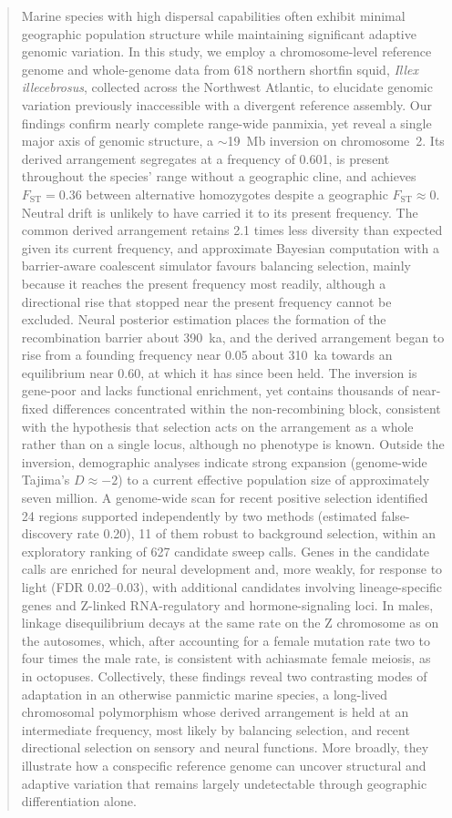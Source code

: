 \documentclass[11pt]{article}
\newcommand{\illex}{\textit{Illex illecebrosus}}
\newcommand{\Fst}{F_\mathrm{ST}}
\begin{document}
\begin{abstract}
\noindent
Marine species with high dispersal capabilities often exhibit minimal geographic population structure while maintaining significant adaptive genomic variation. In this study, we employ a chromosome-level reference genome and whole-genome data from 618 northern shortfin squid, \illex{}, collected across the Northwest Atlantic, to elucidate genomic variation previously inaccessible with a divergent reference assembly. Our findings confirm nearly complete range-wide panmixia, yet reveal a single major axis of genomic structure, a $\sim$19~Mb inversion on chromosome~2. Its derived arrangement segregates at a frequency of 0.601, is present throughout the species' range without a geographic cline, and achieves $\Fst=0.36$ between alternative homozygotes despite a geographic $\Fst\approx0$. Neutral drift is unlikely to have carried it to its present frequency. The common derived arrangement retains 2.1 times less diversity than expected given its current frequency, and approximate Bayesian computation with a barrier-aware coalescent simulator favours balancing selection, mainly because it reaches the present frequency most readily, although a directional rise that stopped near the present frequency cannot be excluded. Neural posterior estimation places the formation of the recombination barrier about 390~ka, and the derived arrangement began to rise from a founding frequency near 0.05 about 310~ka towards an equilibrium near 0.60, at which it has since been held. The inversion is gene-poor and lacks functional enrichment, yet contains thousands of near-fixed differences concentrated within the non-recombining block, consistent with the hypothesis that selection acts on the arrangement as a whole rather than on a single locus, although no phenotype is known. Outside the inversion, demographic analyses indicate strong expansion (genome-wide Tajima's $D\approx-2$) to a current effective population size of approximately seven million. A genome-wide scan for recent positive selection identified 24 regions supported independently by two methods (estimated false-discovery rate 0.20), 11 of them robust to background selection, within an exploratory ranking of 627 candidate sweep calls. Genes in the candidate calls are enriched for neural development and, more weakly, for response to light (FDR 0.02--0.03), with additional candidates involving lineage-specific genes and Z-linked RNA-regulatory and hormone-signaling loci. In males, linkage disequilibrium decays at the same rate on the Z chromosome as on the autosomes, which, after accounting for a female mutation rate two to four times the male rate, is consistent with achiasmate female meiosis, as in octopuses. Collectively, these findings reveal two contrasting modes of adaptation in an otherwise panmictic marine species, a long-lived chromosomal polymorphism whose derived arrangement is held at an intermediate frequency, most likely by balancing selection, and recent directional selection on sensory and neural functions. More broadly, they illustrate how a conspecific reference genome can uncover structural and adaptive variation that remains largely undetectable through geographic differentiation alone.

\end{abstract}
\end{document}
